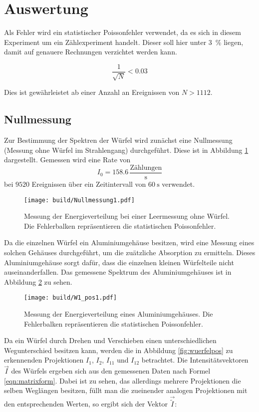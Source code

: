 \newpage
\section{Auswertung}

\label{sec:Auswertung}

Als Fehler wird ein statistischer Poissonfehler verwendet, da es sich in diesem
Experiment um ein Zählexperiment handelt. Dieser soll hier unter \SI{3}{\percent} liegen,
damit auf genauere Rechnungen verzichtet werden kann.

\begin{equation*}
  \frac{1}{\sqrt{N}} < 0.03
\end{equation*}

Dies ist gewährleistet ab einer Anzahl an Ereignissen von $N > \num{1112}$.

\subsection{Nullmessung}
Zur Bestimmung der Spektren der Würfel wird zunächst eine Nullmessung (Messung
ohne Würfel im Strahlengang) durchgeführt. Diese ist in Abbildung \ref{fig:leer}
dargestellt. Gemessen wird eine Rate von
\begin{equation*}
    I_0 = 158.6 \,\frac{\text{Zählungen}}{\text{s}}
\end{equation*}
bei $9520$ Ereignissen über ein Zeitintervall von $\SI{60}{\second}$ verwendet.

\begin{figure}[htb]
  \centering
  \texttt{[image: build/Nullmessung1.pdf]}
  \caption{Messung der Energieverteilung bei einer Leermessung ohne Würfel. Die
  Fehlerbalken repräsentieren die statistischen Poissonfehler.}
  \label{fig:leer}
\end{figure}
\FloatBarrier
Da die einzelnen Würfel ein Aluminiumgehäuse besitzen, wird eine Messung eines solchen
Gehäuses durchgeführt, um die zuätzliche Absorption zu ermitteln. Dieses Aluminiumgehäuse
sorgt dafür, dass die einzelnen kleinen Würfelteile nicht auseinanderfallen. Das
gemessene Spektrum des Aluminiumgehäuses ist in
Abbildung \ref{fig:alu} zu sehen.

\begin{figure}[htb]
  \centering
  \texttt{[image: build/W1\_pos1.pdf]}
  \caption{Messung der Energieverteilung eines Aluminiumgehäuses. Die Fehlerbalken
  repräsentieren die statistischen Poissonfehler.}
  \label{fig:alu}
\end{figure}
\FloatBarrier
\newside
Da ein Würfel durch Drehen und Verschieben einen unterschiedlichen Wegunterschied
besitzen kann, werden die in Abbildung \ref{fig:wuerfelpos} zu erkennenden Projektionen
$I_1$, $I_2$, $I_{11}$ und $I_{12}$ betrachtet. Die Intensitätsvektoren $\vec{I}$ des Würfels ergeben sich aus
den gemessenen Daten nach Formel \eqref{eqn:matrixform}.
Dabei ist zu sehen, das allerdings mehrere Projektionen die selben Weglängen
besitzen, füllt man die zueinender analogen Projektionen mit den entsprechenden Werten,
so ergibt sich der Vektor $\vec{\tilde{I}}$:

